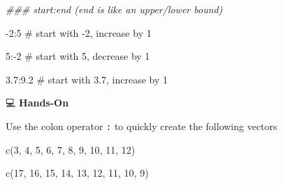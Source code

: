 \documentclass[
  letterpaper,
  DIV=11,
  numbers=noendperiod]{scrreprt}
\newenvironment{Shaded}{\begin{snugshade}}{\end{snugshade}}
\newcommand{\CommentTok}[1]{\textcolor[rgb]{0.37,0.37,0.37}{#1}}
\newcommand{\DecValTok}[1]{\textcolor[rgb]{0.68,0.00,0.00}{#1}}
\newcommand{\DocumentationTok}[1]{\textcolor[rgb]{0.37,0.37,0.37}{\textit{#1}}}
\newcommand{\FloatTok}[1]{\textcolor[rgb]{0.68,0.00,0.00}{#1}}
\newcommand{\FunctionTok}[1]{\textcolor[rgb]{0.28,0.35,0.67}{#1}}
\newcommand{\NormalTok}[1]{\textcolor[rgb]{0.00,0.23,0.31}{#1}}
\newcommand{\SpecialCharTok}[1]{\textcolor[rgb]{0.37,0.37,0.37}{#1}}
\begin{document}
\begin{Shaded}
\begin{Highlighting}[]
\DocumentationTok{\#\#\# start:end (end is like an upper/lower bound)}

\SpecialCharTok{{-}}\DecValTok{2}\SpecialCharTok{:}\DecValTok{5}       \CommentTok{\# start with {-}2, increase by 1}
 
\DecValTok{5}\SpecialCharTok{:{-}}\DecValTok{2}       \CommentTok{\# start with 5, decrease by 1}

\FloatTok{3.7}\SpecialCharTok{:}\FloatTok{9.2}    \CommentTok{\# start with 3.7, increase by 1}
\end{Highlighting}
\end{Shaded}

💻 \textbf{Hands-On}

Use the colon operator \texttt{:} to quickly create the following
vectors

\begin{Shaded}
\begin{Highlighting}[]
\FunctionTok{c}\NormalTok{(}\DecValTok{3}\NormalTok{, }\DecValTok{4}\NormalTok{, }\DecValTok{5}\NormalTok{, }\DecValTok{6}\NormalTok{, }\DecValTok{7}\NormalTok{, }\DecValTok{8}\NormalTok{, }\DecValTok{9}\NormalTok{, }\DecValTok{10}\NormalTok{, }\DecValTok{11}\NormalTok{, }\DecValTok{12}\NormalTok{)}

\FunctionTok{c}\NormalTok{(}\DecValTok{17}\NormalTok{, }\DecValTok{16}\NormalTok{, }\DecValTok{15}\NormalTok{, }\DecValTok{14}\NormalTok{, }\DecValTok{13}\NormalTok{, }\DecValTok{12}\NormalTok{, }\DecValTok{11}\NormalTok{, }\DecValTok{10}\NormalTok{, }\DecValTok{9}\NormalTok{)}
\end{Highlighting}
\end{Shaded}
\end{document}
